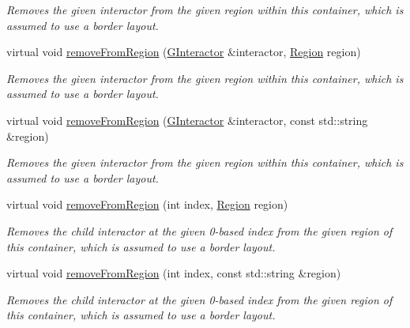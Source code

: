 \begin{DoxyCompactItemize}
\begin{DoxyCompactList}\small\item\em Removes the given interactor from the given region within this container, which is assumed to use a border layout. \end{DoxyCompactList}\item 
virtual void \mbox{\hyperlink{classsgl_1_1GContainer_afee7b65f917c4f6a0fdb1c8ea75406a5}{remove\+From\+Region}} (\mbox{\hyperlink{classsgl_1_1GInteractor}{G\+Interactor}} \&interactor, \mbox{\hyperlink{classsgl_1_1GContainer_a81a01a86de31071a92e6cce0bab9bc4b}{Region}} region)
\begin{DoxyCompactList}\small\item\em Removes the given interactor from the given region within this container, which is assumed to use a border layout. \end{DoxyCompactList}\item 
virtual void \mbox{\hyperlink{classsgl_1_1GContainer_af7a055c83c0e0e3f3722596d7111fcbe}{remove\+From\+Region}} (\mbox{\hyperlink{classsgl_1_1GInteractor}{G\+Interactor}} \&interactor, const std\+::string \&region)
\begin{DoxyCompactList}\small\item\em Removes the given interactor from the given region within this container, which is assumed to use a border layout. \end{DoxyCompactList}\item 
virtual void \mbox{\hyperlink{classsgl_1_1GContainer_a15e3a1d3f3abecc00d68d6df2349f360}{remove\+From\+Region}} (int index, \mbox{\hyperlink{classsgl_1_1GContainer_a81a01a86de31071a92e6cce0bab9bc4b}{Region}} region)
\begin{DoxyCompactList}\small\item\em Removes the child interactor at the given 0-\/based index from the given region of this container, which is assumed to use a border layout. \end{DoxyCompactList}\item 
virtual void \mbox{\hyperlink{classsgl_1_1GContainer_ac839e32fec6ea6b37f6c6da8aa6ce43b}{remove\+From\+Region}} (int index, const std\+::string \&region)
\begin{DoxyCompactList}\small\item\em Removes the child interactor at the given 0-\/based index from the given region of this container, which is assumed to use a border layout. \end{DoxyCompactList}\item 

\end{DoxyCompactItemize}
